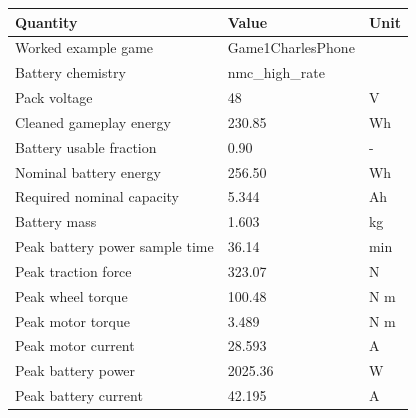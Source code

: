 \begin{tabular}{lll}
\toprule
Quantity & Value & Unit \\
\midrule
Worked example game & Game1CharlesPhone &  \\
Battery chemistry & nmc\_high\_rate &  \\
Pack voltage & 48 & V \\
Cleaned gameplay energy & 230.85 & Wh \\
Battery usable fraction & 0.90 & - \\
Nominal battery energy & 256.50 & Wh \\
Required nominal capacity & 5.344 & Ah \\
Battery mass & 1.603 & kg \\
Peak battery power sample time & 36.14 & min \\
Peak traction force & 323.07 & N \\
Peak wheel torque & 100.48 & N m \\
Peak motor torque & 3.489 & N m \\
Peak motor current & 28.593 & A \\
Peak battery power & 2025.36 & W \\
Peak battery current & 42.195 & A \\
\bottomrule
\end{tabular}

